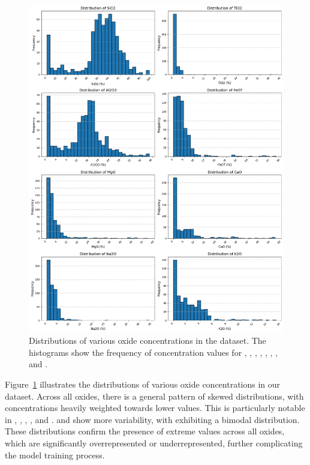 \begin{figure}[h!]
    \centering
    \includegraphics[width=\textwidth]{images/oxide_distributions.png}
    \caption{Distributions of various oxide concentrations in the dataset. The histograms show the frequency of concentration values for , , , , , , , and .}
    \label{fig:oxide_distributions}
\end{figure}

Figure~\ref{fig:oxide_distributions} illustrates the distributions of various oxide concentrations in our dataset.
Across all oxides, there is a general pattern of skewed distributions, with concentrations heavily weighted towards lower values.
This is particularly notable in , , , , and .
 and  show more variability, with  exhibiting a bimodal distribution.
These distributions confirm the presence of extreme values across all oxides, which are significantly overrepresented or underrepresented, further complicating the model training process.

